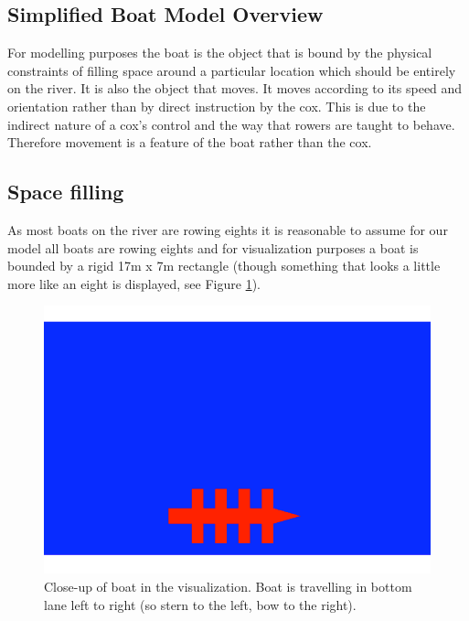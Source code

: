       \subsection{Simplified Boat Model Overview}\label{model:boat:simplified}
      For modelling purposes the boat is the object that is bound by the physical constraints of filling space around a particular location which should be entirely on the river. It is also the object that moves. It moves according to its speed and orientation rather than by direct instruction by the cox. This is due to the indirect nature of a cox's control and the way that rowers are taught to behave. Therefore movement is a feature of the boat rather than the cox.
      
      \subsection{Space filling}\label{model:boat:space_filling}
      As most boats on the river are rowing eights it is reasonable to assume for our model all boats are rowing eights and for visualization purposes a boat is bounded by a rigid 17m x 7m rectangle (though something that looks a little more like an eight is displayed, see Figure \ref{fig:model:boat}). 
      
      \begin{figure}
      \begin{center}
      	\includegraphics[scale=0.5]{images/boat.png}
      	\caption{Close-up of boat in the visualization. Boat is travelling in bottom lane left to right (so stern to the left, bow to the right).}
      	\label{fig:model:boat}
      \end{center}
      \end{figure}
      
